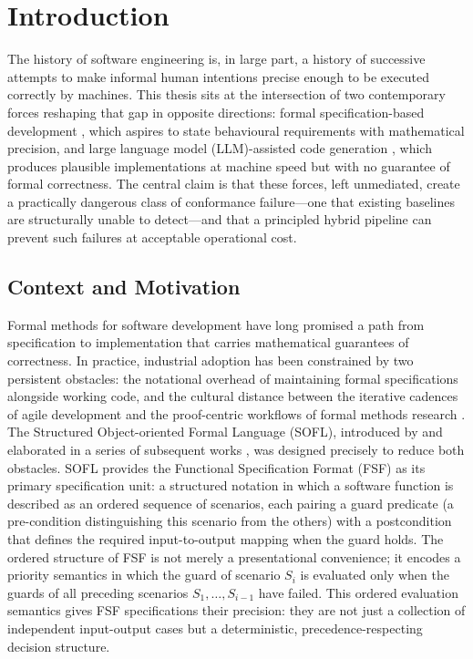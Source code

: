 \chapter{Introduction}
\label{ch:intro}

The history of software engineering is, in large part, a history of successive attempts to make informal human intentions precise enough to be executed correctly by machines.  This thesis sits at the intersection of two contemporary forces reshaping that gap in opposite directions: formal specification-based development \citep{woodcock2009formalsurvey, back1998refinement}, which aspires to state behavioural requirements with mathematical precision, and large language model (LLM)-assisted code generation \citep{chen2021codex, openai2023gpt4}, which produces plausible implementations at machine speed but with no guarantee of formal correctness.  The central claim is that these forces, left unmediated, create a practically dangerous class of conformance failure---one that existing baselines are structurally unable to detect---and that a principled hybrid pipeline can prevent such failures at acceptable operational cost.


\section{Context and Motivation}
\label{sec:intro:motivation}

Formal methods for software development have long promised a path from specification to implementation that carries mathematical guarantees of correctness.  In practice, industrial adoption has been constrained by two persistent obstacles: the notational overhead of maintaining formal specifications alongside working code, and the cultural distance between the iterative cadences of agile development and the proof-centric workflows of formal methods research \citep{woodcock2009formalsurvey}.  The Structured Object-oriented Formal Language (SOFL), introduced by \citet{liu1997sofl} and elaborated in a series of subsequent works \citep{liu2004sofl, liu2014sofl}, was designed precisely to reduce both obstacles.  SOFL provides the Functional Specification Format (FSF) as its primary specification unit: a structured notation in which a software function is described as an ordered sequence of scenarios, each pairing a guard predicate (a pre-condition distinguishing this scenario from the others) with a postcondition that defines the required input-to-output mapping when the guard holds.  The ordered structure of FSF is not merely a presentational convenience; it encodes a priority semantics in which the guard of scenario $S_i$ is evaluated only when the guards of all preceding scenarios $S_1, \ldots, S_{i-1}$ have failed.  This ordered evaluation semantics gives FSF specifications their precision: they are not just a collection of independent input-output cases but a deterministic, precedence-respecting decision structure.

